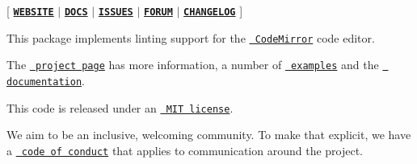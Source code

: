 \mbox{[} \href{https://codemirror.net/6/}{\texttt{ {\bfseries{W\+E\+B\+S\+I\+TE}}}} $\vert$ \href{https://codemirror.net/6/docs/ref/\#lint}{\texttt{ {\bfseries{D\+O\+CS}}}} $\vert$ \href{https://github.com/codemirror/codemirror.next/issues}{\texttt{ {\bfseries{I\+S\+S\+U\+ES}}}} $\vert$ \href{https://discuss.codemirror.net/c/next/}{\texttt{ {\bfseries{F\+O\+R\+UM}}}} $\vert$ \href{https://github.com/codemirror/lint/blob/main/CHANGELOG.md}{\texttt{ {\bfseries{C\+H\+A\+N\+G\+E\+L\+OG}}}} \mbox{]}

This package implements linting support for the \href{https://codemirror.net/6/}{\texttt{ Code\+Mirror}} code editor.

The \href{https://codemirror.net/6/}{\texttt{ project page}} has more information, a number of \href{https://codemirror.net/6/examples/}{\texttt{ examples}} and the \href{https://codemirror.net/6/docs/}{\texttt{ documentation}}.

This code is released under an \href{https://github.com/codemirror/lint/tree/main/LICENSE}{\texttt{ M\+IT license}}.

We aim to be an inclusive, welcoming community. To make that explicit, we have a \href{http://contributor-covenant.org/version/1/1/0/}{\texttt{ code of conduct}} that applies to communication around the project. 